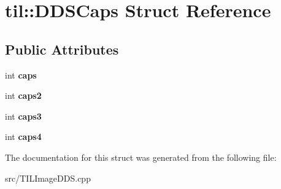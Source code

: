 \hypertarget{structtil_1_1_d_d_s_caps}{
\section{til::DDSCaps Struct Reference}
\label{structtil_1_1_d_d_s_caps}
}
\subsection*{Public Attributes}
\begin{DoxyCompactItemize}
\item 
\hypertarget{structtil_1_1_d_d_s_caps_aa1c6d2b6a1f3794c519683eb70bc11dc}{
int {\bfseries caps}}
\label{structtil_1_1_d_d_s_caps_aa1c6d2b6a1f3794c519683eb70bc11dc}

\item 
\hypertarget{structtil_1_1_d_d_s_caps_a4a57feba70cc1a4671e9cff459a3f68c}{
int {\bfseries caps2}}
\label{structtil_1_1_d_d_s_caps_a4a57feba70cc1a4671e9cff459a3f68c}

\item 
\hypertarget{structtil_1_1_d_d_s_caps_ae06c40765e9c4fe85d3d1928f0ecd803}{
int {\bfseries caps3}}
\label{structtil_1_1_d_d_s_caps_ae06c40765e9c4fe85d3d1928f0ecd803}

\item 
\hypertarget{structtil_1_1_d_d_s_caps_a0a6fa2139edad85db9a8bd89016b3ff0}{
int {\bfseries caps4}}
\label{structtil_1_1_d_d_s_caps_a0a6fa2139edad85db9a8bd89016b3ff0}

\end{DoxyCompactItemize}


The documentation for this struct was generated from the following file:\begin{DoxyCompactItemize}
\item 
src/TILImageDDS.cpp\end{DoxyCompactItemize}
